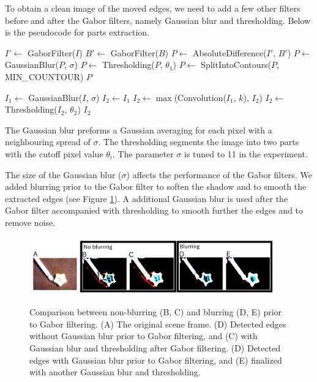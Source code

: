 \documentclass{article}
\begin{document}
To obtain a clean image of the moved edges, we need to add a few other filters before and after the Gabor filters, namely Gaussian blur and thresholding. Below is the pseudocode for parts extraction.\\

\begin{algorithmic}[H]
		\State $I' \leftarrow$ GaborFilter($I$)
		\State $B' \leftarrow$ GaborFilter($B$)
		\State $P \leftarrow$ AbsoluteDifference($I'$, $B'$)
		\State $P \leftarrow$ GaussianBlur($P$, $\sigma$)
		\State $P \leftarrow$ Thresholding($P$, $\theta_1$)
		\State $P \leftarrow$ SplitIntoContours($P$, MIN\_COUNTOUR)
		\State \Return $P$
	\EndFunction 
\end{algorithmic}

\begin{algorithmic}[H]
		\State $I_1 \leftarrow$ GaussianBlur($I$, $\sigma$)
		\State $I_2 \leftarrow I_1$
			\State $I_2 \leftarrow \max$(Convolution($I_1$, $k$), $I_2$)
		\EndFor
		\State $I_2 \leftarrow$ Thresholding($I_2$, $\theta_2$)
		\State \Return $I_2$
	\EndFunction
	
\end{algorithmic}

The Gaussian blur preforms a Gaussian averaging for each pixel with a neighbouring spread of $\sigma$. The thresholding segments the image into two parts with the cutoff pixel value $\theta_i$. The parameter $\sigma$ is tuned to 11 in the experiment. 

The size of the Gaussian blur ($\sigma$) affects the performance of the Gabor filters. We added blurring prior to the Gabor filter to soften the shadow and to smooth the extracted edges (see Figure \ref{figure:gaussian_blur}). A additional Gaussian blur is used after the Gabor filter accompanied with thresholding to smooth further the edges and to remove noise. 

\begin{figure}[tbp]
\begin{center}
\caption{Comparison between non-blurring (B, C) and blurring (D, E) prior to Gabor filtering. (A) The original scene frame.  (D) Detected edges without Gaussian blur prior to Gabor filtering, and (C) with Gaussian blur and thresholding after Gabor filtering. (D) Detected edges with Gaussian blur prior to Gabor filtering, and (E) finalized with another Gaussian blur and thresholding.}
  \includegraphics[width=0.95\textwidth]{2}
\label{figure:gaussian_blur}
\end{center}
\end{figure}
\end{document}
